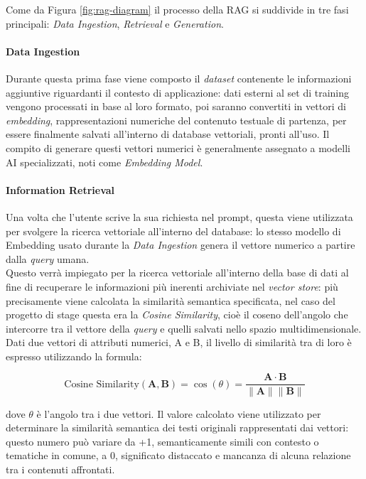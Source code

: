 Come da Figura \ref{fig:rag-diagram} il processo della RAG si suddivide in tre fasi principali: \textit{Data Ingestion}, \textit{Retrieval} e \textit{Generation}.

\paragraph*{Data Ingestion}
Durante questa prima fase viene composto il \textit{dataset} contenente le informazioni aggiuntive riguardanti il contesto di applicazione: dati esterni al set di training vengono processati in base al loro formato, poi saranno convertiti in vettori di \textit{embedding}, rappresentazioni numeriche del contenuto testuale di partenza, per essere finalmente salvati all'interno di database vettoriali, pronti all'uso.
Il compito di generare questi vettori numerici è generalmente assegnato a modelli AI specializzati, noti come \textit{Embedding Model}.

\paragraph*{Information Retrieval}
Una volta che l'utente scrive la sua richiesta nel prompt, questa viene utilizzata per svolgere la ricerca vettoriale all'interno del database: lo stesso modello di Embedding usato durante la \textit{Data Ingestion} genera il vettore numerico a partire dalla \textit{query} umana.\\
Questo verrà impiegato per la ricerca vettoriale all'interno della base di dati al fine di recuperare le informazioni più inerenti archiviate nel \textit{vector store}: più precisamente viene calcolata la similarità semantica specificata, nel caso del progetto di stage questa era la \textit{Cosine Similarity}, cioè il coseno dell'angolo che intercorre tra il vettore della \textit{query} e quelli salvati nello spazio multidimensionale.\\
Dati due vettori di attributi numerici, A e B, il livello di similarità tra di loro è espresso utilizzando la formula:

\[
\text{Cosine Similarity}(\mathbf{A}, \mathbf{B}) = \cos(\theta) = \frac{\mathbf{A} \cdot \mathbf{B}}{\|\mathbf{A}\| \|\mathbf{B}\|} 
\]

dove \begin{math}\theta\end{math} è l'angolo tra i due vettori.
Il valore calcolato viene utilizzato per determinare la similarità semantica dei testi originali rappresentati dai vettori: questo numero può variare da +1, semanticamente simili con contesto o tematiche in comune, a 0, significato distaccato e mancanza di alcuna relazione tra i contenuti affrontati.

